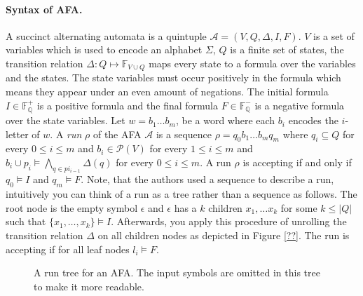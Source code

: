 \paragraph*{Syntax of AFA.} A succinct alternating automata is a quintuple $\mathcal{A} = (V,Q,\Delta, I, F)$. $V$ is a set of variables which is used to encode an alphabet $\Sigma$, $Q$ is a finite set of states, the transition relation $\Delta : Q \mapsto \mathbb{F}_{V \cup Q}$ maps every state to a formula over the variables and the states. 
The state variables must occur positively in the formula which means they appear under an even amount of negations.
The initial formula $I \in \mathbb{F^+_Q}$ is a positive formula and the final formula $F \in \mathbb{F^-_Q}$ is a negative formula over the state variables.
Let $w = b_1 \dots b_m$, be a word where each $b_i$ encodes the $i$-letter of $w$. A \emph{run} $\rho$ of the AFA $\mathcal{A}$ is a sequence $\rho = q_0b_1\dots b_m q_m$ where $q_i \subseteq Q$ for every $0 \leq i \leq m$ and $b_i \in \mathcal{P}(V)$ for every $1 \leq i \leq m$ and $b_i \cup p_i \vDash \bigwedge_{q\in pi_{i-1}} \Delta (q)$ for every $0 \leq i \leq m$.
A run $\rho$ is accepting if and only if $q_0 \models I$ and $q_m \models F$.
Note, that the authors used a sequence to describe a run, intuitively you can think of a run as a tree rather than a sequence as follows. The root node is the empty symbol $\epsilon$ and $\epsilon$ has a $k$ children $x_1,\dots x_k$ for some $k \leq |Q|$ such that $\{x_1,\dots, x_k\} \models I$. Afterwards, you apply this procedure of unrolling the transition relation $\Delta$ on all children nodes as depicted in Figure \ref{??}.
The run is accepting if for all leaf nodes $l_i \models F$.
\begin{figure}
\centering
		\caption{A run tree for an AFA. The input symbols are omitted in this tree to make it more readable.} \label{fig:decision-tree}
\end{figure}

